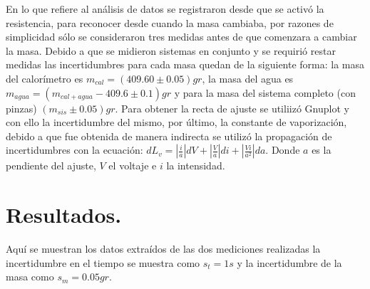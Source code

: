 \documentclass[a4paper]{article}
\begin{document}
En lo que refiere al análisis de datos se registraron desde que se activó la resistencia, para reconocer desde cuando la masa cambiaba, por razones de simplicidad sólo se consideraron tres medidas antes de que comenzara a cambiar la masa. Debido a que se midieron sistemas en conjunto y se requirió restar medidas las incertidumbres para cada masa quedan de la siguiente forma: la masa del calorímetro es $m_{cal} = (409.60\pm0.05)gr$, la masa del agua es $m_{agua} = (m_{cal + agua} - 409.6 \pm 0.1)gr$ y para la masa del sistema completo (con pinzas) $(m_{sis}\pm0.05)gr$. Para obtener la recta de ajuste se utiliizó Gnuplot y con ello la incertidumbre del mismo, por último, la constante de vaporización, debido a que fue obtenida de manera indirecta se utilizó la propagación de incertidumbres con la ecuación: $dL_v = \left|\frac{i}{a} \right|dV + \left|\frac{V}{a} \right|di +\left|\frac{Vi}{a^2} \right|da$. Donde $a$ es la pendiente del ajuste, $V$ el voltaje e $i$ la intensidad.

\section*{Resultados.}
Aquí se muestran los datos extraídos de las dos mediciones realizadas la incertidumbre en el tiempo se muestra como $s_t = 1 s$ y la incertidumbre de la masa como $s_m = 0.05 gr$.
\end{document}
